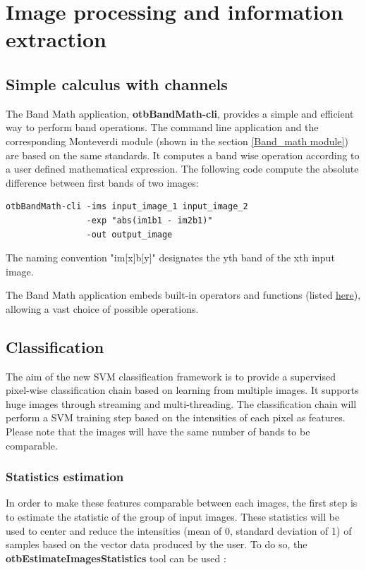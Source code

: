 \section{Image processing and information extraction}\label{sec:improc}

\subsection{Simple calculus with channels}\label{ssec:calculus}

The Band Math application, \textbf{otbBandMath-cli}, provides a simple and efficient way to perform band operations. The command line application and the corresponding Monteverdi module (shown in the section \ref{Band_math module}) are based on the same standards. It computes a band wise operation according to a user defined mathematical expression. The following code compute the absolute difference between first bands of two images:

\begin{verbatim}
otbBandMath-cli -ims input_image_1 input_image_2 
                -exp "abs(im1b1 - im2b1)"
                -out output_image
\end{verbatim}

The naming convention "im[x]b[y]" designates the yth band of the xth input image.

The Band Math application embeds built-in operators and functions (listed \href{http://muparser.sourceforge.net/mup_features.html#idDef2}{here}), allowing a vast choice of possible operations. 

\subsection{Classification}\label{ssec:classification}

The aim of the new SVM classification framework is to provide a supervised pixel-wise classification chain based on learning from multiple images. It supports huge images through streaming and multi-threading.
The classification chain will perform a SVM training step based on the intensities of each pixel as features. Please note that the images will have the same number of bands to be comparable.

\subsubsection{Statistics estimation}
In order to make these features comparable between each images, the first step is to estimate the statistic of the group of input images. These statistics will be used to center and reduce the intensities (mean of 0, standard deviation of 1) of samples based on the vector data produced by the user. To do so, the \textbf{otbEstimateImagesStatistics} tool can be used :

